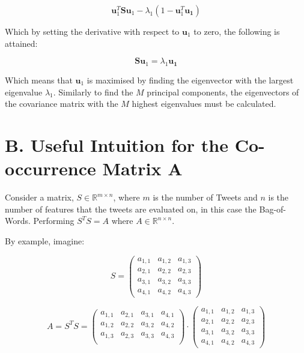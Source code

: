 \documentclass[11pt,a4paper]{article}
\begin{document}
\begin{equation*}
\mathbf{u}_1^T \mathbf{S} \mathbf{u}_1 - \lambda_1 (1 - \mathbf{u}_1^T \mathbf{u_1})
\label{lagrange_uSu}
\end{equation*} 

Which by setting the derivative with respect to $\mathbf{u}_1$ to zero, the following is attained:


\begin{equation*}
\mathbf{S} \mathbf{u}_1 = \lambda_1  \mathbf{u_1}
\label{eig_uSu}
\end{equation*} 

Which means that $\mathbf{u}_1$ is maximised by finding the eigenvector with the largest eigenvalue $\lambda_1$. Similarly to find the $M$ principal components, the eigenvectors of the covariance matrix with the $M$ highest eigenvalues must be calculated.
\clearpage
\section*{B. Useful Intuition for the Co-occurrence Matrix $\mathbf{A}$}
Consider a matrix, $S\in \mathbb{R}^{m\times n}$, where $m$ is the number of Tweets and $n$ is the number of features that the tweets are evaluated on, in this case the Bag-of-Words. Performing $S^TS = A$ where $A \in \mathbb{R}^{n\times n}$. 

By example, imagine:

\begin{equation}
S = \left( \begin{matrix}
a_{1, 1} & a_{1, 2} & a_{1, 3} \\ 
a_{2, 1} & a_{2, 2} & a_{2, 3} \\
a_{3, 1} & a_{3, 2} & a_{3, 3} \\
a_{4, 1} & a_{4, 2} & a_{4, 3} 
\end{matrix} \right)
\end{equation}

\begin{equation}
A = S^TS =
 \left( \begin{matrix}
a_{1, 1} & a_{2, 1} & a_{3, 1} & a_{4, 1} \\ 
a_{1, 2} & a_{2, 2} & a_{3, 2} & a_{4, 2} \\ 
a_{1, 3} & a_{2, 3} & a_{3, 3} & a_{4, 3} \\ 

\end{matrix} \right)
\cdot \left( \begin{matrix}
a_{1, 1} & a_{1, 2} & a_{1, 3} \\ 
a_{2, 1} & a_{2, 2} & a_{2, 3} \\
a_{3, 1} & a_{3, 2} & a_{3, 3} \\
a_{4, 1} & a_{4, 2} & a_{4, 3} 
\end{matrix} \right)
\end{equation}
\end{document}
